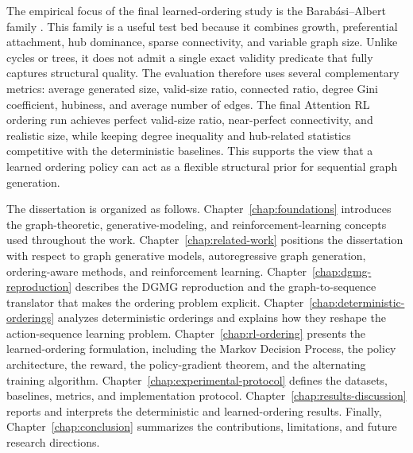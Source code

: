 The empirical focus of the final learned-ordering study is the Barab\'asi--Albert family \cite{barabasi1999emergence}. This family is a useful test bed because it combines growth, preferential attachment, hub dominance, sparse connectivity, and variable graph size. Unlike cycles or trees, it does not admit a single exact validity predicate that fully captures structural quality. The evaluation therefore uses several complementary metrics: average generated size, valid-size ratio, connected ratio, degree Gini coefficient, hubiness, and average number of edges. The final Attention RL ordering run achieves perfect valid-size ratio, near-perfect connectivity, and realistic size, while keeping degree inequality and hub-related statistics competitive with the deterministic baselines. This supports the view that a learned ordering policy can act as a flexible structural prior for sequential graph generation.

The dissertation is organized as follows. Chapter~\ref{chap:foundations} introduces the graph-theoretic, generative-modeling, and reinforcement-learning concepts used throughout the work. Chapter~\ref{chap:related-work} positions the dissertation with respect to graph generative models, autoregressive graph generation, ordering-aware methods, and reinforcement learning. Chapter~\ref{chap:dgmg-reproduction} describes the DGMG reproduction and the graph-to-sequence translator that makes the ordering problem explicit. Chapter~\ref{chap:deterministic-orderings} analyzes deterministic orderings and explains how they reshape the action-sequence learning problem. Chapter~\ref{chap:rl-ordering} presents the learned-ordering formulation, including the Markov Decision Process, the policy architecture, the reward, the policy-gradient theorem, and the alternating training algorithm. Chapter~\ref{chap:experimental-protocol} defines the datasets, baselines, metrics, and implementation protocol. Chapter~\ref{chap:results-discussion} reports and interprets the deterministic and learned-ordering results. Finally, Chapter~\ref{chap:conclusion} summarizes the contributions, limitations, and future research directions.

